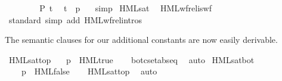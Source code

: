 \begin{isabellebody}
\ \ \ \ \isamarkupfalse%
\isanewline
\ \ \isamarkupfalse%
\ {\isacartoucheopen}P\ t{\isacartoucheclose}\ \isamarkupfalse%
\ {\isacartoucheopen}t\ {\isacharequal}{\kern0pt}\ {\isacharparenleft}{\kern0pt}p{\isacharcomma}{\kern0pt}\ {\isasymphi}{\isacharparenright}{\kern0pt}{\isacartoucheclose}\ \isamarkupfalse%
\ simp\isanewline
{}\isamarkupfalse%
%
\endisatagproof
{\isafoldproof}%
%
\isadelimproof
\isanewline
%
\endisadelimproof
%
\isadelimvisible
\isanewline
%
\endisadelimvisible
%
\isatagvisible
{}\isamarkupfalse%
\ HML{\isacharunderscore}{\kern0pt}sat\ \isamarkupfalse%
\ HML{\isacharunderscore}{\kern0pt}wf{\isacharunderscore}{\kern0pt}rel{\isacharunderscore}{\kern0pt}is{\isacharunderscore}{\kern0pt}wf\ \isanewline
\ \ \isamarkupfalse%
\ {\isacharparenleft}{\kern0pt}standard{\isacharcomma}{\kern0pt}\ {\isacharparenleft}{\kern0pt}simp\ add{\isacharcolon}{\kern0pt}\ HML{\isacharunderscore}{\kern0pt}wf{\isacharunderscore}{\kern0pt}rel{\isachardot}{\kern0pt}intros{\isacharparenright}{\kern0pt}{\isacharplus}{\kern0pt}{\isacharparenright}{\kern0pt}%
\endisatagvisible
{\isafoldvisible}%
%
\isadelimvisible
%
\endisadelimvisible
%
\begin{isamarkuptext}%
The semantic clauses for our additional constants are now easily derivable.%
\end{isamarkuptext}\isamarkuptrue%
\isamarkupfalse%
\ HML{\isacharunderscore}{\kern0pt}sat{\isacharunderscore}{\kern0pt}top{\isacharcolon}{\kern0pt}\isanewline
\ \ \ {\isacartoucheopen}p\ {\isasymTurnstile}\ HML{\isacharunderscore}{\kern0pt}true{\isacartoucheclose}\isanewline
%
\isadelimproof
\ \ %
\endisadelimproof
%
\isatagproof
{}\isamarkupfalse%
\ bot{\isacharunderscore}{\kern0pt}cset{\isachardot}{\kern0pt}abs{\isacharunderscore}{\kern0pt}eq\ \isamarkupfalse%
\ auto%
\endisatagproof
{\isafoldproof}%
%
\isadelimproof
\isanewline
%
\endisadelimproof
{}\isamarkupfalse%
\ HML{\isacharunderscore}{\kern0pt}sat{\isacharunderscore}{\kern0pt}bot{\isacharcolon}{\kern0pt}\isanewline
\ \ \ {\isacartoucheopen}{\isasymnot}\ p\ {\isasymTurnstile}\ HML{\isacharunderscore}{\kern0pt}false{\isacartoucheclose}\isanewline
%
\isadelimproof
\ \ %
\endisadelimproof
%
\isatagproof
{}\isamarkupfalse%
\ HML{\isacharunderscore}{\kern0pt}sat{\isacharunderscore}{\kern0pt}top\ \isamarkupfalse%
\ auto%
\endisatagproof
{\isafoldproof}%

\end{isabellebody}
